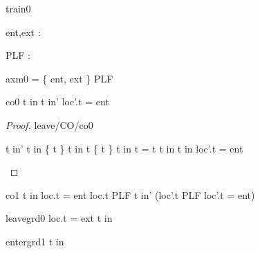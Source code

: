 \documentclass[12pt]{amsart}
\begin{document}
\begin{machine}{train0}
\begin{constant}
	ent,ext : \BLK
\end{constant}
\begin{constant}
	PLF : \set [\BLK]
\end{constant}

\begin{assumption}{axm0}
	\BLK = \{ ent, ext \} \bunion PLF
\end{assumption}

%
\begin{constraint}{co0}
	\neg t \in in \land t \in in' \implies  loc'.t = ent %
\end{constraint}
%
\begin{proof}{leave/CO/co0}
	\begin{calculation}
		t \in in' 
	\hint{=}{ \ref{a0} }
		t \in in \setminus \{ t \} 
		t \in in \land \neg t \in \{ t \} 
		t \in in \land \neg t = t 
		t \in in \land \false
		\false
		\neg t \in in \implies  loc'.t = ent
	\end{calculation}
\end{proof}
%
\begin{constraint}{co1}
	 t \in in \land loc.t = ent  \land \neg loc.t \in PLF 
\implies t \in in' \land (loc'.t \in PLF \lor loc'.t = ent)
\end{constraint}


%

\begin{evguard}{leave}{grd0}
	loc.t = ext \land t \in in
\end{evguard}

\begin{evguard}{enter}{grd1}
	\neg t \in in
\end{evguard}


\end{machine}
\end{document}
